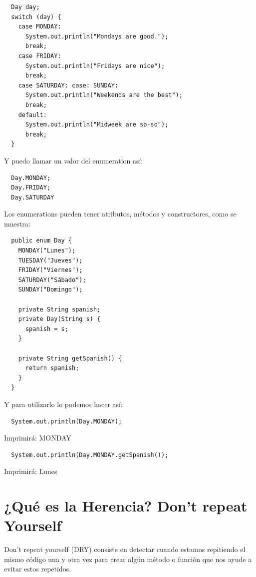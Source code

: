 \documentclass{article}
\begin{document}
\begin{verbatim}
  Day day;
  switch (day) {
    case MONDAY:
      System.out.println("Mondays are good.");
      break;
    case FRIDAY:
      System.out.println("Fridays are nice");
      break;
    case SATURDAY: case: SUNDAY:
      System.out.println("Weekends are the best");
      break;
    default:
      System.out.println("Midweek are so-so");
      break;
  }
\end{verbatim}

Y puedo llamar un valor del enumeration así:\\

\begin{verbatim}
  Day.MONDAY;
  Day.FRIDAY;
  Day.SATURDAY
\end{verbatim}

Los enumerations pueden tener atributos, métodos y constructores, como se
muestra:\\

\begin{verbatim}
  public enum Day {
    MONDAY("Lunes");
    TUESDAY("Jueves");
    FRIDAY("Viernes");
    SATURDAY("Sábado");
    SUNDAY("Domingo");

    private String spanish;
    private Day(String s) {
      spanish = s;
    }

    private String getSpanish() {
      return spanish;
    }
  }
\end{verbatim}

Y para utilizarlo lo podemos hacer así:\\

\begin{verbatim}
  System.out.println(Day.MONDAY);
\end{verbatim}

Imprimirá: MONDAY\\

\begin{verbatim}
  System.out.println(Day.MONDAY.getSpanish());
\end{verbatim}

Imprimirá: Lunes\\


\section{¿Qué es la Herencia? Don't repeat Yourself}%
Don’t repeat yourself (DRY) consiste en detectar cuando estamos repitiendo el
mismo código una y otra vez para crear algún método o función que nos ayude a
evitar estos repetidos.\\
\end{document}
